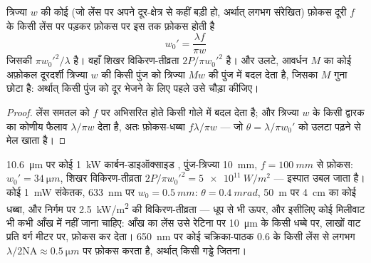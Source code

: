 \begin{proposition}[किसी पुंज को फ़ोकस और फैलाना]\label{prop:b2:laser:focus}
त्रिज्या $w$ की कोई  (जो लेंस पर अपने दूर-क्षेत्र से कहीं बड़ी
हो, अर्थात् लगभग संरेखित) फ़ोकस दूरी
$f$ के किसी लेंस पर पड़कर फ़ोकस पर इस  तक फ़ोकस होती है
\[
w_0' = \frac{\lambda f}{\pi w}
\]
जिसकी  $\pi w_0'^2/\lambda$ है। वहाँ शिखर
विकिरण-तीव्रता $2P/\pi w_0'^2$ है। और उलटे, आवर्धन $M$ का कोई अफ़ोकल दूरदर्शी
त्रिज्या $w$ की किसी पुंज को त्रिज्या $Mw$ की पुंज में बदल देता है,
जिसका  $M$ गुना छोटा है: अर्थात् किसी पुंज को दूर भेजने के लिए पहले उसे
चौड़ा कीजिए।
\end{proposition}

\begin{proof}
लेंस समतल  को $f$ पर अभिसरित होते किसी गोले में बदल देता है;
और त्रिज्या $w$ के किसी द्वारक का  कोणीय फैलाव
$\lambda/\pi w$ देता है, अतः फ़ोकस-धब्बा $f\lambda/\pi w$ --- जो
$\theta = \lambda/\pi w_0'$ को उलटा पढ़ने से मेल खाता है।
\end{proof}

\begin{example}[काटना, पढ़ना, ताकना]\label{ex:b2:laser:focus}
\qty{10.6}{\micro m} पर कोई \qty{1}{kW} कार्बन-डाइऑक्साइड , पुंज-त्रिज्या
\qty{10}{mm}, $f = \qty{100}{mm}$ से फ़ोकस: $w_0' = \qty{34}{\micro m}$,
शिखर विकिरण-तीव्रता $2P/\pi w_0'^2 = \qty{5e11}{W/m^2}$ --- इस्पात उबल जाता है।
कोई \qty{1}{mW} संकेतक, \qty{633}{nm} पर $w_0 = \qty{0.5}{mm}$: $\theta =
\qty{0.4}{mrad}$, \qty{50}{m} पर \qty{4}{cm} का कोई धब्बा, और निर्गम पर
\qty{2.5}{kW/m^2} की विकिरण-तीव्रता --- धूप से भी ऊपर, और इसीलिए कोई
मिलीवाट भी कभी आँख में नहीं जाना चाहिए: आँख का लेंस उसे रेटिना पर
\qty{10}{\micro m} के किसी धब्बे पर, लाखों वाट प्रति वर्ग
मीटर पर, फ़ोकस कर देता। \qty{650}{nm} पर कोई चक्रिका-पाठक 
$0.6$ के किसी लेंस से लगभग $\lambda/2\mathrm{NA} \approx \qty{0.5}{\micro m}$ पर फ़ोकस करता है,
अर्थात् किसी गड्ढे जितना।
\end{example}

